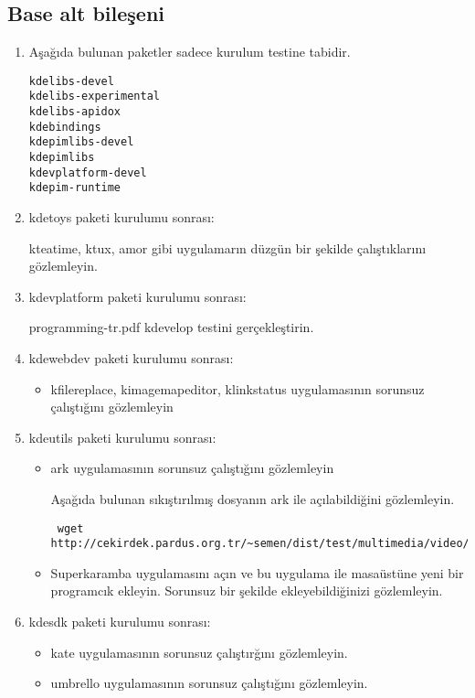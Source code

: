 \documentclass[a4paper,10pt]{article}
\begin{document}
\subsection*{Base alt bileşeni}

\begin{enumerate} 
\item  Aşağıda bulunan paketler sadece kurulum testine tabidir.
\begin{verbatim}
kdelibs-devel
kdelibs-experimental
kdelibs-apidox 
kdebindings
kdepimlibs-devel
kdepimlibs
kdevplatform-devel
kdepim-runtime
\end{verbatim}
\item kdetoys paketi kurulumu sonrası:

kteatime, ktux, amor gibi uygulamarın düzgün bir şekilde çalıştıklarını gözlemleyin.
\item kdevplatform paketi kurulumu sonrası:

programming-tr.pdf  kdevelop testini gerçekleştirin.

\item kdewebdev paketi kurulumu sonrası:
\begin{itemize}
 \item kfilereplace, kimagemapeditor, klinkstatus uygulamasının sorunsuz çalıştığını gözlemleyin
\end{itemize}

\item kdeutils paketi kurulumu sonrası:

\begin{itemize}
 \item ark uygulamasının sorunsuz çalıştığını gözlemleyin

Aşağıda bulunan sıkıştırılmış dosyanın ark ile açılabildiğini gözlemleyin.
\begin{verbatim}
 wget http://cekirdek.pardus.org.tr/~semen/dist/test/multimedia/video/cokluortam.tar
\end{verbatim}

 \item Superkaramba uygulamasını açın ve bu uygulama ile masaüstüne yeni bir programcık ekleyin. Sorunsuz bir şekilde ekleyebildiğinizi gözlemleyin.
\end{itemize}

\item kdesdk paketi kurulumu sonrası:
\begin{itemize}
 \item kate uygulamasının sorunsuz çalıştırğını gözlemleyin.
 \item umbrello uygulamasının sorunsuz çalıştığını gözlemleyin.
\end{itemize}


\end{enumerate}
\end{document}
